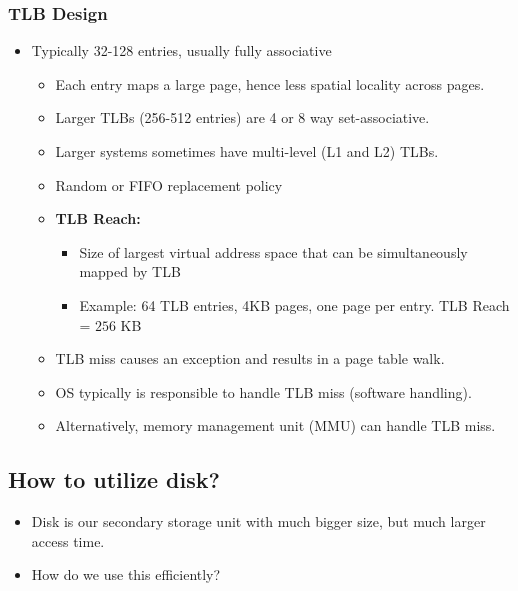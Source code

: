 \documentclass[10pt]{article}
\begin{document}
\subsubsection*{TLB Design}
\begin{itemize}
    \item Typically 32-128 entries, usually fully associative
    \begin{itemize}
        \item Each entry maps a large page, hence less spatial locality across pages.
        \item Larger TLBs (256-512 entries) are 4 or 8 way set-associative.
        \item Larger systems sometimes have multi-level (L1 and L2) TLBs.
        \item Random or FIFO replacement policy
        \item \textbf{TLB Reach:}
        \begin{itemize}
            \item Size of largest virtual address space that can be simultaneously mapped by TLB
            \item Example: 64 TLB entries, 4KB pages, one page per entry.  TLB Reach = $256$ KB
        \end{itemize}
        \item TLB miss causes an exception and results in a page table walk.
        \item OS typically is responsible to handle TLB miss (software handling).
        \item Alternatively, memory management unit (MMU) can handle TLB miss.
    \end{itemize}
\end{itemize}

\subsection*{How to utilize disk?}
\begin{itemize}
    \item Disk is our secondary storage unit with much bigger size, but much larger access time.
    \item How do we use this efficiently?
\end{itemize}
\end{document}
